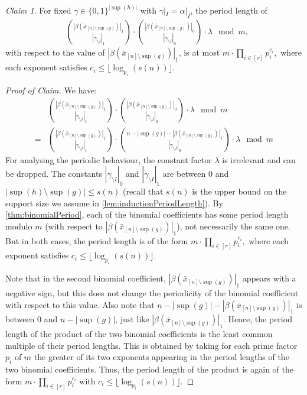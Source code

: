 \documentclass[11pt]{article}
\DeclareMathOperator{\supp}{sup}
\theoremstyle{definition}
\theoremstyle{plain}
\theoremstyle{remark}
\newtheorem{claim}{Claim}[lemma]
\newenvironment{claimproof}[1][Proof of Claim]{\begin{proof}[#1] \renewcommand{\qedsymbol}{$\lrcorner$}}{ \end{proof}}
\theoremstyle{remark}
\begin{document}
\begin{claim}
	\label{claim:periodOfBinomialCoefficient}	
	For fixed $\gamma \in \{0,1\}^{|\supp(h)|}$ with $\gamma|_I = \alpha|_I$, the period length of 
	\begin{align*}
		&\binom{|\beta(\bar{x}_{[n] \setminus \supp(g)})|_1 }{|\gamma_{\setminus I}|_1} \cdot  \binom{|\beta(\bar{x}_{[n] \setminus \supp(g)})|_0 }{|\gamma_{\setminus I}|_0} \cdot \lambda \mod m,
	\end{align*}
	with respect to the value of $|\beta(\bar{x}_{[n] \setminus \supp(g)})|_1$, 
	is at most $
	m \cdot \prod_{i \in[r]} p_i^{c_i},
	$
	where each exponent satisfies $c_i \leq \lfloor \log_{p_i}(s(n)) \rfloor$.
\end{claim}
\begin{claimproof}
	We have:
	\begin{align*}
		&\binom{|\beta(\bar{x}_{[n] \setminus \supp(g)})|_1 }{|\gamma_{\setminus I}|_1} \cdot \binom{|\beta(\bar{x}_{[n] \setminus \supp(g)})|_0 }{|\gamma_{\setminus I}|_0} \cdot \lambda \mod m\\
		= & \binom{|\beta(\bar{x}_{[n] \setminus \supp(g)})|_1 }{|\gamma_{\setminus I}|_1} \cdot \binom{n-|\supp(g)| -|\beta(\bar{x}_{[n] \setminus \supp(g)})|_1 }{|\gamma_{\setminus I}|_0} \cdot \lambda \mod m
	\end{align*}
	For analysing the periodic behaviour, the constant factor $\lambda$ is irrelevant and can be dropped. The constants $|\gamma_{\setminus I}|_0$ and $|\gamma_{\setminus I}|_1$ are between $0$ and $|\supp(h) \setminus \supp(g)| \leq s(n)$ (recall that $s(n)$ is the upper bound on the support size we assume in \cref{lem:inductionPeriodLength}). 
	By \cref{thm:binomialPeriod}, each of the binomial coefficients has some period length modulo $m$ (with respect to $|\beta(\bar{x}_{[n] \setminus \supp(g)})|_1$), not necessarily the same one. But in both cases, the period length is of the form 
	$
	m \cdot \prod_{i \in [r]} p_i^{c_i},
	$
	where each exponent satisfies $c_i \leq \lfloor \log_{p_i}(s(n)) \rfloor$.
	
	Note that in the second binomial coefficient, $|\beta(\bar{x}_{[n] \setminus \supp(g)})|_1$ appears with a negative sign, but this does not change the periodicity of the binomial coefficient with respect to this value.
	Also note that $n-|\supp(g)| -|\beta(\bar{x}_{[n] \setminus \supp(g)})|_1$ is between $0$ and $n-|\supp(g)|$, just like $|\beta(\bar{x}_{[n] \setminus \supp(g)})|_1$.   
	Hence, the period length of the product of the two binomial coefficients is the least common multiple of their period lengths. This is obtained by taking for each prime factor $p_i$ of $m$ the greater of its two exponents appearing in the period lengths of the two binomial coefficients. Thus, the period length of the product is again of the form $m \cdot \prod_{i \in[r]} p_i^{c_i}$ with $c_i \leq \lfloor \log_{p_i}(s(n)) \rfloor$.
\end{claimproof}
\end{document}
